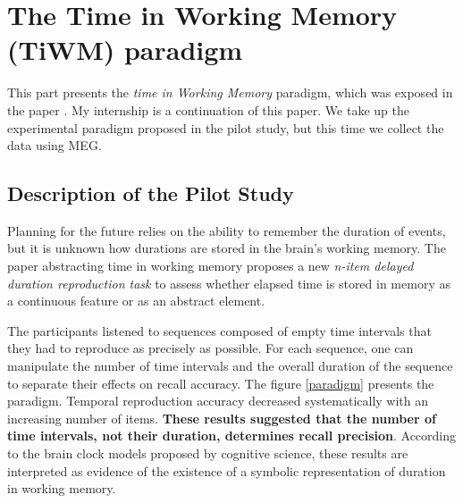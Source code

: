  
\section{The Time in Working Memory (TiWM) paradigm}
 
This part presents the \textit{time in Working Memory} paradigm, which was exposed in the paper \cite{herbst2021abstracting}. My internship is a continuation of this paper. We take up the experimental paradigm proposed in the pilot study, but this time we collect the data using MEG.
 
\subsection{Description of the Pilot Study}
 
Planning for the future relies on the ability to remember the duration of events, but it is unknown how durations are stored in the brain's working memory.  The paper abstracting time in working memory proposes a new \textit{n-item delayed duration reproduction task} to assess whether elapsed time is stored in memory as a continuous feature or as an abstract element.
 
 
The participants listened to sequences composed of empty time intervals that they had to reproduce as precisely as possible. For each sequence, one can manipulate the number of time intervals and the overall duration of the sequence to separate their effects on recall accuracy. The figure \ref{paradigm} presents the paradigm. Temporal reproduction accuracy decreased systematically with an increasing number of items. \textbf{These results suggested that the number of time intervals, not their duration, determines recall precision}. According to the brain clock models proposed by cognitive science, these results are interpreted as evidence of the existence of a symbolic representation of duration in working memory.
 
